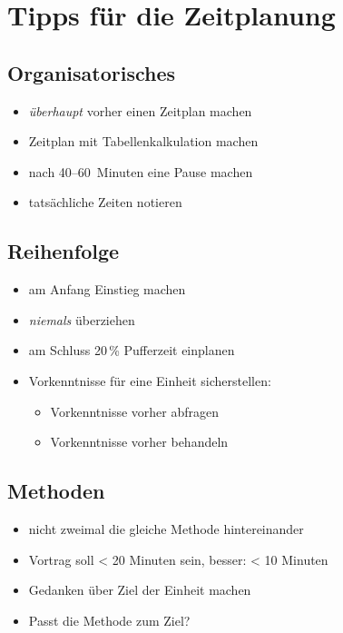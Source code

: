 \chapter{Tipps für die Zeitplanung}
\label{workshop-zeitplanung}


\section{Organisatorisches}
\begin{itemize}
    \item \emph{überhaupt} vorher einen Zeitplan machen
    \item Zeitplan mit Tabellenkalkulation machen
    \item nach 40--60~Minuten eine Pause machen
    \item tatsächliche Zeiten notieren
\end{itemize}


\section{Reihenfolge}
\begin{itemize}
    \item am Anfang Einstieg machen
    \item \emph{niemals} überziehen
    \item am Schluss 20\,\% Pufferzeit einplanen
    \item Vorkenntnisse für eine Einheit sicherstellen:
    \begin{itemize}
        \item Vorkenntnisse vorher abfragen
        \item Vorkenntnisse vorher behandeln
    \end{itemize}
\end{itemize}


\section{Methoden}
\begin{itemize}
    \item nicht zweimal die gleiche Methode hintereinander
    \item Vortrag soll < 20 Minuten sein, besser: < 10 Minuten
    \item Gedanken über Ziel der Einheit machen
    \item Passt die Methode zum Ziel?
\end{itemize}
